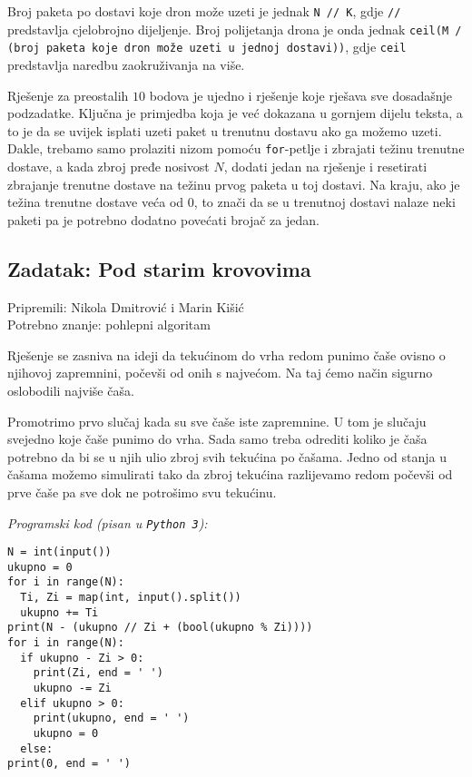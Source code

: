 \documentclass[a4paper]{article}
\begin{document}
Broj paketa po dostavi koje dron može uzeti je jednak \texttt{N // K}, gdje
\texttt{//} predstavlja cjelobrojno dijeljenje. Broj polijetanja drona je onda
jednak \texttt{ceil(M / (broj paketa koje dron može uzeti u jednoj dostavi))},
gdje \texttt{ceil} predstavlja naredbu zaokruživanja na više.

Rješenje za preostalih $10$ bodova je ujedno i rješenje koje rješava sve
dosadašnje podzadatke. Ključna je primjedba koja je već dokazana u gornjem
dijelu teksta, a to je da se uvijek isplati uzeti paket u trenutnu dostavu ako
ga možemo uzeti. Dakle, trebamo samo prolaziti nizom pomoću \texttt{for}-petlje
i zbrajati težinu trenutne dostave, a kada zbroj pređe nosivost $N$, dodati
jedan na rješenje i resetirati zbrajanje trenutne dostave na težinu prvog
paketa u toj dostavi. Na kraju, ako je težina trenutne dostave veća od $0$, to
znači da se u trenutnoj dostavi nalaze neki paketi pa je potrebno dodatno
povećati brojač za jedan.

\subsection*{Zadatak: Pod starim krovovima}
\textsf{Pripremili: Nikola Dmitrović i Marin Kišić}\\
\textsf{Potrebno znanje: pohlepni algoritam}

Rješenje se zasniva na ideji da tekućinom do vrha redom punimo čaše ovisno o
njihovoj zapremnini, počevši od onih s najvećom. Na taj ćemo način sigurno
oslobodili najviše čaša.

Promotrimo prvo slučaj kada su sve čaše iste zapremnine. U tom je slučaju
svejedno koje čaše punimo do vrha. Sada samo treba odrediti koliko je čaša
potrebno da bi se u njih ulio zbroj svih tekućina po čašama. Jedno od stanja u
čašama možemo simulirati tako da zbroj tekućina razlijevamo redom počevši od
prve čaše pa sve dok ne potrošimo svu tekućinu.

\textit{Programski kod (pisan u \texttt{Python 3}):}

\vspace{-2ex}
\begin{verbatim}
N = int(input())
ukupno = 0
for i in range(N):
  Ti, Zi = map(int, input().split())
  ukupno += Ti
print(N - (ukupno // Zi + (bool(ukupno % Zi))))
for i in range(N):
  if ukupno - Zi > 0:
    print(Zi, end = ' ')
    ukupno -= Zi
  elif ukupno > 0:
    print(ukupno, end = ' ')
    ukupno = 0
  else:
print(0, end = ' ')
\end{verbatim}
\end{document}
